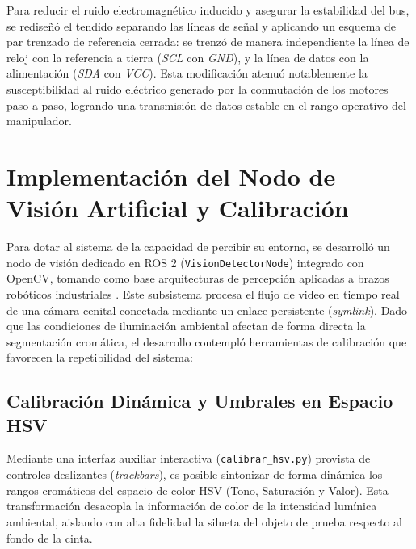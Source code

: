 \documentclass[12pt, a4paper]{report}
\begin{document}
Para reducir el ruido electromagnético inducido y asegurar la estabilidad del bus, se rediseñó el tendido separando las líneas de señal y aplicando un esquema de par trenzado de referencia cerrada: se trenzó de manera independiente la línea de reloj con la referencia a tierra (\textit{SCL} con \textit{GND}), y la línea de datos con la alimentación (\textit{SDA} con \textit{VCC}). Esta modificación atenuó notablemente la susceptibilidad al ruido eléctrico generado por la conmutación de los motores paso a paso, logrando una transmisión de datos estable en el rango operativo del manipulador.

\section{Implementación del Nodo de Visión Artificial y Calibración}
Para dotar al sistema de la capacidad de percibir su entorno, se desarrolló un nodo de visión dedicado en ROS 2 (\texttt{VisionDetectorNode}) integrado con OpenCV, tomando como base arquitecturas de percepción aplicadas a brazos robóticos industriales \cite{bib:vo}. Este subsistema procesa el flujo de video en tiempo real de una cámara cenital conectada mediante un enlace persistente (\textit{symlink}). Dado que las condiciones de iluminación ambiental afectan de forma directa la segmentación cromática, el desarrollo contempló herramientas de calibración que favorecen la repetibilidad del sistema:

\subsection{Calibración Dinámica y Umbrales en Espacio HSV} 
Mediante una interfaz auxiliar interactiva (\texttt{calibrar\_hsv.py}) provista de controles deslizantes (\textit{trackbars}), es posible sintonizar de forma dinámica los rangos cromáticos del espacio de color HSV (Tono, Saturación y Valor). Esta transformación desacopla la información de color de la intensidad lumínica ambiental, aislando con alta fidelidad la silueta del objeto de prueba respecto al fondo de la cinta. 
\end{document}
